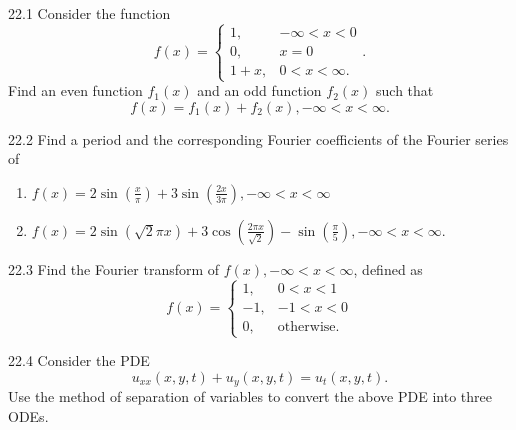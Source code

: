 
\begin{problem}{22.1}
  Consider the function
  \begin{equation*}
    f(x) = \begin{cases}
      1, & -\infty < x < 0\\
    0, & x = 0 \\
    1 + x, & 0 < x < \infty
    .\end{cases}
  .\end{equation*}
  Find an even function $f_1(x)$ and an odd function $f_2(x)$ such that
  \begin{equation*}
    f(x) = f_1(x) + f_2(x), -\infty < x < \infty
  .\end{equation*}
\end{problem}

\begin{problem}{22.2}
  Find a period and the corresponding Fourier coefficients of the Fourier series of
  \begin{enumerate}[label=\alph*)]
    \item $f(x) = 2 \sin \left( \frac{x}{\pi} \right) + 3 \sin \left( \frac{2x}{3\pi} \right), -\infty < x < \infty$
    \item $f(x) = 2 \sin (\sqrt{2}\pi x) + 3 \cos \left( \frac{2 \pi x}{\sqrt{2}} \right) - \sin \left( \frac{\pi}{5} \right), -\infty < x < \infty$.
  \end{enumerate}
\end{problem}

\begin{problem}{22.3}
  Find the Fourier transform of $f(x), -\infty < x < \infty$, defined as
  \begin{equation*}
    f(x) = \begin{cases}
      1, & 0 < x < 1\\
    -1, & -1 < x < 0 \\
    0, & \text{otherwise}
    .\end{cases}
  \end{equation*}
\end{problem}

\begin{problem}{22.4}
  Consider the PDE
  \begin{equation*}
    u_{x x}(x,y,t) + u_y(x,y,t) = u_t(x,y,t)
  .\end{equation*}
  Use the method of separation of variables to convert the above PDE into three ODEs.
\end{problem}

